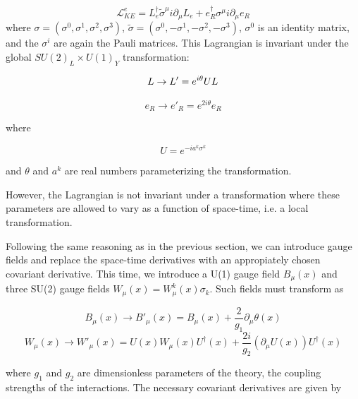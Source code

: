  \begin{equation}
 \mathcal{L}_{KE}^{e} = L_{e}^{\dagger}\tilde{\sigma}^{\mu}i\partial_{\mu}L_{e}+ e_{R}^{\dagger}\sigma^{\mu}i\partial_{\mu}e_{R}
 \end{equation}
where $\sigma = (\sigma^{0}, \sigma^{1},\sigma^{2}, \sigma^{3})$, $\tilde{\sigma} = (\sigma^{0}, -\sigma^{1},-\sigma^{2}, -\sigma^{3})$, $\sigma^{0}$ is an identity matrix, and the $\sigma^{i}$ are again the Pauli matrices. This Lagrangian is invariant under the global $SU(2)_{L}\times U(1)_{Y}$ transformation:

\begin{equation}
L\rightarrow L' = e^{i\theta}UL\\
\end{equation}

\begin{equation}
e_{R}\rightarrow e'_{R} = e^{2i\theta}e_{R}
\end{equation}

where

\begin{equation}
U = e^{-ia^{k}\sigma^{k}}
\end{equation}

and $\theta$ and $a^{k}$ are real numbers parameterizing the transformation.

 However, the Lagrangian is not invariant under a transformation where these parameters are allowed to vary as a function of space-time, i.e. a local transformation.

Following the same reasoning as in the previous section, we can introduce gauge fields and replace the space-time derivatives with an appropiately chosen covariant derivative. This time, we introduce a U(1) gauge field $B_{\mu}(x)$ and three SU(2) gauge fields $W_{\mu}(x)= W_{\mu}^{k}(x)\sigma_{k}$. Such fields must transform as

\begin{equation}
B_{\mu}(x)\rightarrow B'_{\mu}(x) = B_{\mu}(x) + \frac{2}{g_{1}}\partial_{\mu}\theta(x)
\end{equation}
\begin{equation}
W_{\mu}(x)\rightarrow W'_{\mu}(x) = U(x)W_{\mu}(x)U^{\dagger}(x) + \frac{2i}{g_{2}}(\partial_{\mu}U(x))U^{\dagger}(x)
\end{equation}

where $g_{1}$ and $g_{2}$ are dimensionless parameters of the theory, the coupling strengths of the interactions. The necessary covariant derivatives are given by

